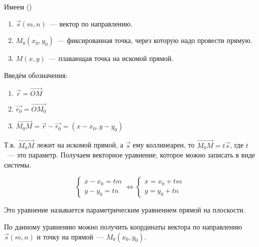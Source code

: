 \begin{twocolumns}
  Имеем ()

  \begin{enumerate}
  \item
    \(\vec{s}(m, n)\)~--- вектор по направлению.

  \item
    \(M_0 (x_0, y_0)\)~--- фиксированная точка, через которую надо провести
    прямую.

  \item
    \(M (x, y)\)~--- плавающая точка на искомой прямой.
  \end{enumerate}

  Введём обозначения:

  \begin{enumerate}
  \item
    \(\vec{r} = \vec{OM}\)

  \item
    \(\vec{r_0} = \vec{OM_0}\)

  \item
    \(\vec{M_0M} = \vec{r} - \vec{r_0} = (x - x_0, y - y_0)\)
  \end{enumerate}
\end{twocolumns}

Т.к. \(\vec{M_0M}\) лежит на искомой прямой, а \(\vec{s}\) ему коллинеарен, то
\(\vec{M_0M} = t \vec{s}\), где \(t\)~--- это параметр. Получаем векторное
уравнение, которое можно записать в виде системы.

\begin{equation*}
  \begin{cases}
    x - x_0 = t m \\
    y - y_0 = t n
  \end{cases}
  \iff
  \begin{cases}
    x = x_0 + t m \\
    y = y_0 + t n
\end{cases}
\end{equation*}

Это уравнение называется параметрическим уравнением прямой на плоскости.

\begin{remark}
  По данному уравнению можно получить координаты вектора по направлению
  \(\vec{s}(m, n)\) и точку на прямой~--- \(M_0 (x_0, y_0)\).
\end{remark}



